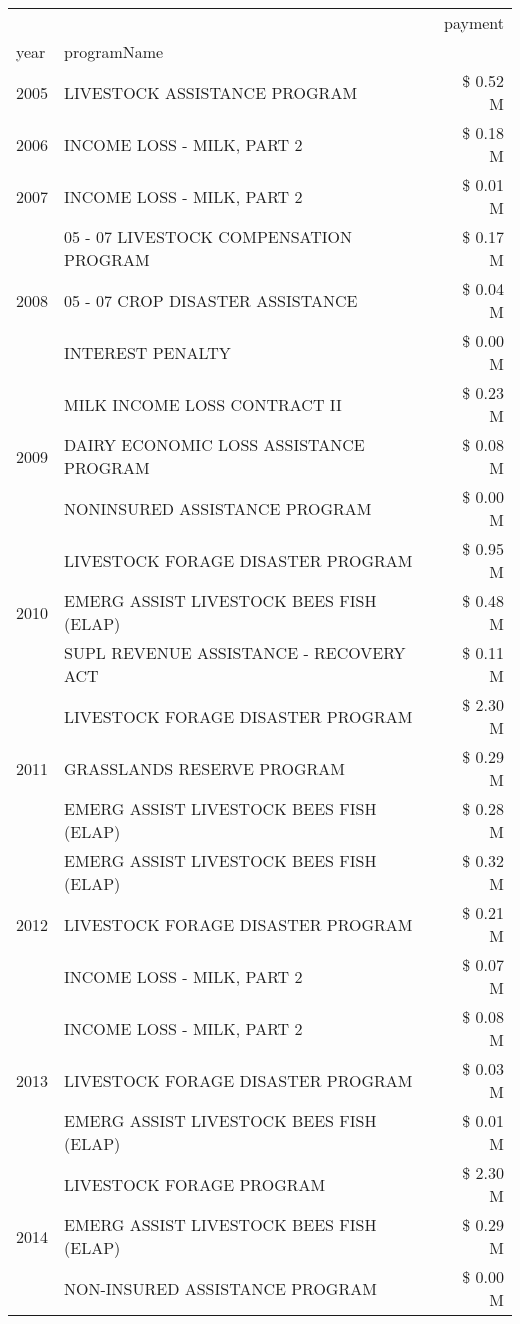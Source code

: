 \begin{tabular}{llr}
\toprule
 &  & payment \\
year & programName &  \\
\midrule
2005 & LIVESTOCK ASSISTANCE PROGRAM & \$ 0.52 M \\
\cline{1-3}
2006 & INCOME LOSS - MILK, PART 2 & \$ 0.18 M \\
\cline{1-3}
2007 & INCOME LOSS - MILK, PART 2 & \$ 0.01 M \\
\cline{1-3}
\multirow[t]{3}{*}{2008} & 05 - 07 LIVESTOCK COMPENSATION PROGRAM & \$ 0.17 M \\
 & 05 - 07 CROP DISASTER ASSISTANCE & \$ 0.04 M \\
 & INTEREST PENALTY & \$ 0.00 M \\
\cline{1-3}
\multirow[t]{3}{*}{2009} & MILK INCOME LOSS CONTRACT II & \$ 0.23 M \\
 & DAIRY ECONOMIC LOSS ASSISTANCE PROGRAM & \$ 0.08 M \\
 & NONINSURED ASSISTANCE PROGRAM & \$ 0.00 M \\
\cline{1-3}
\multirow[t]{3}{*}{2010} & LIVESTOCK FORAGE DISASTER PROGRAM & \$ 0.95 M \\
 & EMERG ASSIST LIVESTOCK BEES FISH (ELAP) & \$ 0.48 M \\
 & SUPL REVENUE ASSISTANCE - RECOVERY ACT & \$ 0.11 M \\
\cline{1-3}
\multirow[t]{3}{*}{2011} & LIVESTOCK FORAGE DISASTER PROGRAM & \$ 2.30 M \\
 & GRASSLANDS RESERVE PROGRAM & \$ 0.29 M \\
 & EMERG ASSIST LIVESTOCK BEES FISH (ELAP) & \$ 0.28 M \\
\cline{1-3}
\multirow[t]{3}{*}{2012} & EMERG ASSIST LIVESTOCK BEES FISH (ELAP) & \$ 0.32 M \\
 & LIVESTOCK FORAGE DISASTER PROGRAM & \$ 0.21 M \\
 & INCOME LOSS - MILK, PART 2 & \$ 0.07 M \\
\cline{1-3}
\multirow[t]{3}{*}{2013} & INCOME LOSS - MILK, PART 2 & \$ 0.08 M \\
 & LIVESTOCK FORAGE DISASTER PROGRAM & \$ 0.03 M \\
 & EMERG ASSIST LIVESTOCK BEES FISH (ELAP) & \$ 0.01 M \\
\cline{1-3}
\multirow[t]{3}{*}{2014} & LIVESTOCK FORAGE PROGRAM & \$ 2.30 M \\
 & EMERG ASSIST LIVESTOCK BEES FISH (ELAP) & \$ 0.29 M \\
 & NON-INSURED ASSISTANCE PROGRAM & \$ 0.00 M \\

\end{tabular}

